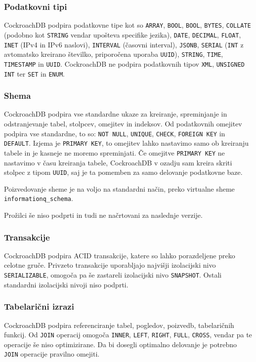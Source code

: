 \documentclass[a4paper, 12pt]{book}
\begin{document}
\subsubsection{Podatkovni tipi}
CockroachDB podpira podatkovne tipe kot so \texttt{ARRAY}, \texttt{BOOL}, \texttt{BOOL}, \texttt{BYTES}, \texttt{COLLATE} (podobno kot \texttt{STRING} vendar upošteva specifike jezika), \texttt{DATE}, \texttt{DE\-CI\-MAL}, \texttt{FLOAT}, \texttt{INET} (IPv4 in IPv6 naslovi), \texttt{INTERVAL} (časovni interval), \texttt{JSONB}, \texttt{SERIAL} (\texttt{INT} z avtomatsko kreirano številko, priporočena uporaba \texttt{UUID}), \texttt{STRING}, \texttt{TIME}, \texttt{TIMESTAMP} in \texttt{UUID}. CockroachDB ne podpira podatkovnih tipov \texttt{XML}, \texttt{UNSIGNED INT} ter \texttt{SET} in \texttt{ENUM}.

\subsubsection{Shema}
CockroachDB podpira vse standardne ukaze za kreiranje, spreminjanje in odstranjevanje tabel, stolpcev, omejitev in indeksov. Od podatkovnih omejitev podpira vse standardne, to so: \texttt{NOT NULL}, \texttt{UNIQUE}, \texttt{CHECK}, \texttt{FOREIGN KEY} in \texttt{DEFAULT}. Izjema je \texttt{PRIMARY KEY}, to omejitev lahko nastavimo samo ob kreiranju tabele in je kasneje ne moremo spreminjati. Če omejitve \texttt{PRIMARY KEY} ne nastavimo v času kreiranja tabele, CockroachDB v ozadju sam kreira skriti stolpec z tipom \texttt{UUID}, saj je ta pomemben za samo delovanje podatkovne baze.

Poizvedovanje sheme je na voljo na standardni način, preko virtualne sheme \texttt{informationq\_schema}.

Prožilci še niso podprti in tudi ne načrtovani za naslednje verzije.

\subsubsection{Transakcije}
CockroachDB podpira ACID transakcije, katere so lahko porazdeljene preko celotne gruče. Privzeto transakcije uporabljajo najvišji izolacijski nivo \texttt{SE\-RI\-AL\-IZ\-ABLE}, omogoča pa še zastareli izolacijski nivo \texttt{SNAP\-SHOT}. Ostali standardni izolacijski nivoji niso podprti.

\subsubsection{Tabelarični izrazi}
CockroachDB podpira referenciranje tabel, pogledov, poizvedb, tabelaričnih funkcij. Od \texttt{JOIN} operacij omogoča \texttt{INNER}, \texttt{LEFT}, \texttt{RIGHT}, \texttt{FULL}, \texttt{CROSS}, vendar pa te operacije še niso optimizirane. Da bi dosegli optimalno delovanje je potrebno \texttt{JOIN} operacije pravilno omejiti.
\end{document}
